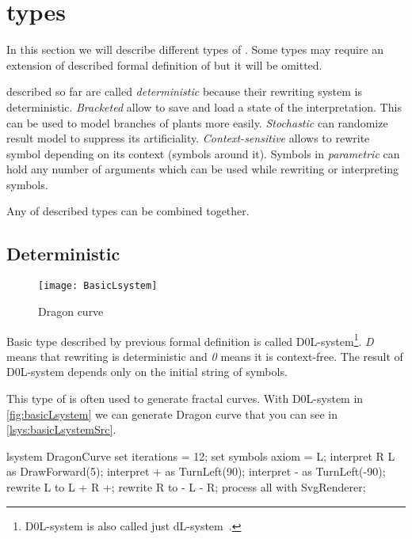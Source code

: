 
\section{\lsystem types}
\label{sec:lsysTypes}

In this section we will describe different types of \lsystems.
Some types may require an extension of described formal definition of \lsystem but it will be omitted.

\lsystems described so far are called \emph{deterministic \lsystems} because their rewriting system is deterministic.
\emph{Bracketed \lsystems} allow to save and load a state of the interpretation.
This can be used to model branches of plants more easily.
\emph{Stochastic \lsystems} can randomize result model to suppress its artificiality.
\emph{Context-sensitive \lsystems} allows to rewrite symbol depending on its context (symbols around it).
Symbols in \emph{parametric \lsystems} can hold any number of arguments which can be used while rewriting or interpreting symbols.

Any of described types can be combined together.



\subsection{Deterministic \lsystems}

\newcommand{\dzerolsystem}{\mbox{D0L-system}\xspace}
\newcommand{\dlsystem}{\mbox{dL-system}\xspace}


\begin{wrapfigure}{r}{0.50\textwidth}
	\vspace{-30pt}
	\texttt{[image: BasicLsystem]}
	\caption{Dragon curve}
	\label{fig:basicLsystem}
\end{wrapfigure}


Basic \lsystem type described by previous formal definition is called \dzerolsystem\footnote{\dzerolsystem is also called just \dlsystem~\cite{Zar04}.}.
\emph{D} means that rewriting is deterministic and \emph{0} means it is context-free.
The result of \dzerolsystem depends only on the initial string of symbols.

This type of \lsystem is often used to generate fractal curves.
With \dzerolsystem in \autoref{fig:basicLsystem} we can generate Dragon curve that you can see in \autoref{lsys:basicLsystemSrc}.

\begin{Lsystem}[label=lsys:basicLsystemSrc,caption={\dzerolsystem for generation of Dragon curve (\autoref{fig:basicLsystem})}]
lsystem DragonCurve {
	set iterations = 12;
	set symbols axiom = L;
	interpret R L as DrawForward(5);
	interpret + as TurnLeft(90);
	interpret - as TurnLeft(-90);
	rewrite L to L + R +;
	rewrite R to - L - R;
}
process all with SvgRenderer;
\end{Lsystem}


